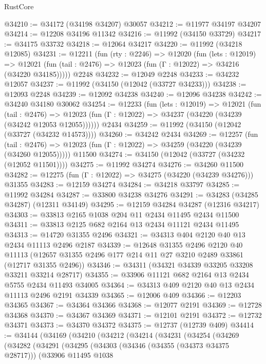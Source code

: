 \begin{lexlean}{RustCore}
\begin{coremodule}
@34210 := @34172 (@34198 @34207) @30057
@34212 := @11977 @34197 @34207
@34214 := @12208 @34196 @11342
@34216 := @11992 (@34150 @33729)
@34217 := @34175 @33732
@34218 := @12064 @34217
@34220 := @11992 (@34218 @12085)
@34231 := @12211
    (fun (rty : @2246) =>
    @12020
      (fun (lets : @12019) =>
      @12021 (fun (tail : @2476) => @12023 (fun (Γ : @12022) => @34216 (@34220 @34185)))))
    @2248
@34232 := @12049 @2248
@34233 := @34232 @12057
@34237 := @11992 (@34150 (@12042 (@33727 @34233)))
@34238 := @12093 @2248
@34239 := @12092 @34238
@34240 := @12096 @34238
@34242 := @34240 @34180 @30062
@34254 := @12233
    (fun (lets : @12019) =>
    @12021
      (fun (tail : @2476) =>
      @12023 (fun (Γ : @12022) => @34237 (@34220 (@34239 (@34242 @12053 @12055))))))
    @2434
@34259 := @11992 (@34150 (@12042 (@33727 (@34232 @14573))))
@34260 := @34242 @2434
@34269 := @12257
    (fun (tail : @2476) => @12023 (fun (Γ : @12022) => @34259 (@34220 (@34239 (@34260 @12055)))))
    @11500
@34274 := @34150 (@12042 (@33727 (@34232 (@12052 @11501))))
@34275 := @11992 @34274
@34276 := @34260 @11500
@34282 := @12275 (fun (Γ : @12022) => @34275 (@34220 (@34239 @34276))) @31355
@34283 := @12159 @34274
@34284 := @34218 @33797
@34285 := @11992 @34284
@34287 := @33800 @34238 @34276
@34291 := @34283 (@34285 @34287) (@12311 @34149)
@34295 := @12159 @34284 @34287 (@12316 @34217)
@34303 := @33813 @2165 @1038 @204 @11 @2434 @11495 @2434 @11500
@34311 := @33813 @2125 @682 @2164 @13 @2434 @11121 @2434 @11495
@34313 := @14720 @31355 @2496
@34321 := @34313 @404 @2120 @40 @13 @2434 @11113 @2496 @2187
@34339 := @12648
    @31355
    @2496
    @2120
    @40
    @11113
    (@12657 @31355 @2496 @177 @214 @11 @27 @3210 @2489 @33861 (@12717 @31355 @2496))
@34346 := @34311 (@34321 @34339 @33205 @33208 @33211 @33214 @28717)
@34355 := @33906 @11121 @682 @2164 @13 @2434 @5755 @2434 @11493 @34005
@34364 := @34313 @409 @2120 @40 @13 @2434 @11113 @2496 @2191 @34339
@34365 := @12006 @409
@34366 := @12203 @34365
@34367 := @34364 @34366
@34368 := @12077 @2191
@34369 := @12728 @34368
@34370 := @34367 @34369
@34371 := @12101 @2191
@34372 := @12732 @34371
@34373 := @34370 @34372
@34375 := @12737 (@12739 @409)
@34414 := @34144
    (@34169
      (@34210
        (@34212
          (@34214
            (@34231
              (@34254
                (@34269
                  (@34282
                    (@34291
                      (@34295
                        (@34303
                          (@34346 (@34355 (@34373 @34375 @28717)))
                          (@33906
                            @11495
                            @1038

\end{coremodule}
\end{lexlean}
